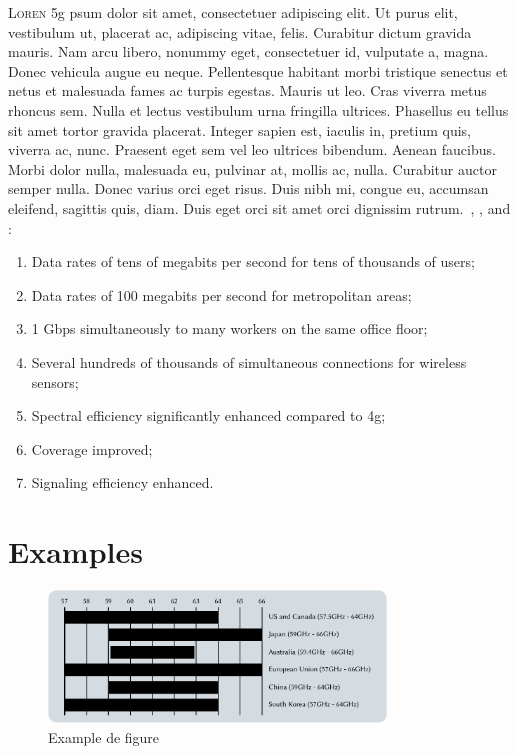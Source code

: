 \vspace*{6cm}
\lettrine[lines=1]{\color{redxlim}L}{oren} \gls{5g} psum dolor sit amet, consectetuer adipiscing elit. Ut purus elit, vestibulum ut, placerat ac, adipiscing vitae, felis. Curabitur dictum gravida mauris. Nam arcu libero, nonummy eget, consectetuer id, vulputate a, magna. Donec vehicula augue eu neque. Pellentesque habitant morbi tristique senectus et netus et malesuada fames ac turpis egestas. Mauris ut leo. Cras viverra metus rhoncus sem. Nulla et lectus vestibulum urna fringilla ultrices. Phasellus eu tellus sit amet tortor gravida placerat. Integer sapien est, iaculis in, pretium quis, viverra ac, nunc. Praesent eget sem vel leo ultrices bibendum. Aenean faucibus. Morbi dolor nulla, malesuada eu, pulvinar at, mollis ac, nulla. Curabitur auctor semper nulla. Donec varius orci eget risus. Duis nibh mi, congue eu, accumsan eleifend, sagittis quis, diam. Duis eget orci sit amet orci dignissim rutrum.~\cite{Osseiran2014}, \cite{Iwamura2015}, \cite{Evaluation2016} and \cite{Vu2017}:
\begin{enumerate}[nolistsep]
\item Data rates of tens of megabits per second for tens of thousands of users;
\item Data rates of 100 megabits per second for metropolitan areas;
\item 1 Gbps simultaneously to many workers on the same office floor;
\item Several hundreds of thousands of simultaneous connections for wireless sensors;
\item Spectral efficiency significantly enhanced compared to \gls{4g};
\item Coverage improved;
\item Signaling efficiency enhanced.
\end{enumerate}

\section{Examples}
\lipsum[1]

\begin{figure}[h]
	\centering
	\includegraphics[width=0.8\textwidth]{chapters/images/ISM-60ghzBandAlocation}
		\caption{Example de figure}
		\label{fig-ISM60ghz}
\end{figure}

